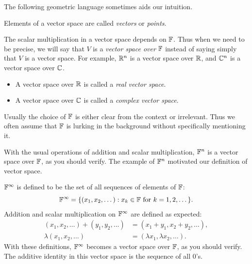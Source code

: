 The following geometric language sometimes aids our intuition.

\begin{definition}\label{ax:1.21}
Elements of a vector space are called \emph{vectors} or \emph{points}.
\end{definition}

The scalar multiplication in a vector space depends on $\mathbb{F}$. Thus when we need
to be precise, we will say that $V$ is a \emph{vector space over} $\mathbb{F}$ instead
of saying simply that $V$ is a vector space. For example, $\mathbb{R}^n$ is a vector
space over $\mathbb{R}$, and $\mathbb{C}^n$ is a vector space over $\mathbb{C}$.

\begin{definition}\label{ax:1.22}\leavevmode
\begin{itemize}
\item A vector space over $\mathbb{R}$ is called a \emph{real vector space}.
\item A vector space over $\mathbb{C}$ is called a \emph{complex vector space}.
\end{itemize}
\end{definition}

Usually the choice of $\mathbb{F}$ is either clear from the context or irrelevant. Thus
we often assume that $\mathbb{F}$ is lurking in the background without specifically
mentioning it.

%
With the usual operations of addition and scalar multiplication, $\mathbb{F}^n$ is a
vector space over $\mathbb{F}$, as you should verify. The example of $\mathbb{F}^n$ motivated
our definition of vector space.

\begin{example}[$\F^\infty$]\label{ax:1.23}
$\F^\infty$ is defined to be the set of all sequences of elements of $\mathbb{F}$:
\[ \mathbb{F}^\infty = \{(x_1,x_2,\dots) : x_k\in\mathbb{F} \text{ for } k=1,2,\dots\}. \]
Addition and scalar multiplication on $\F^\infty$ are defined as expected:
\begin{align*}
(x_1,x_2,\dots)+(y_1,y_2,\dots) &= (x_1+y_1,x_2+y_2,\dots),\\
\lambda(x_1,x_2,\dots) &= (\lambda x_1,\lambda x_2,\dots).
\end{align*}
With these definitions, $\F^\infty$ becomes a vector space over $\mathbb{F}$, as you
should verify. The additive identity in this vector space is the sequence of
all $0$'s.
\end{example}

